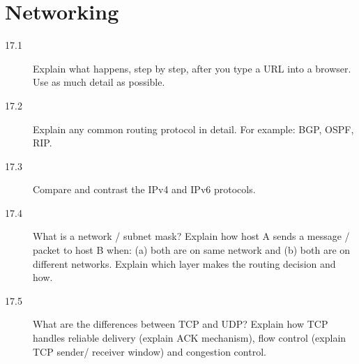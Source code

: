 \chapter{Networking}

\begin{description}
\item[17.1] Explain what happens, step by step, after you type a URL into a browser. Use as much detail as possible.

\item[17.2] Explain any common routing protocol in detail. For example: BGP, OSPF, RIP.	

\item[17.3] Compare and contrast the IPv4 and IPv6 protocols.

\item[17.4] What is a network / subnet mask? Explain how host A sends a message / packet to host B when: (a) both are on same network and (b) both are on different networks. Explain which layer makes the routing decision and how.

\item[17.5] What are the differences between TCP and UDP? Explain how TCP handles reliable delivery (explain ACK mechanism), flow control (explain TCP sender/ receiver window) and congestion control.	

\end{description}

